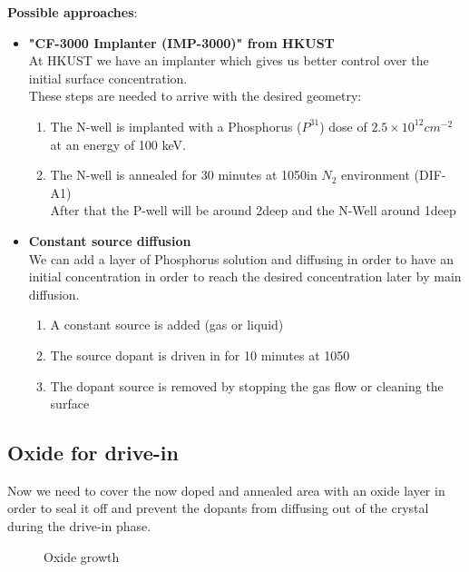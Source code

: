 \textbf{Possible approaches}:
\begin{itemize}
	\item \textbf{"CF-3000 Implanter (IMP-3000)" from HKUST} \\
	At HKUST we have an implanter which gives us better control over the initial surface concentration. \\
	These steps are needed to arrive with the desired geometry:
	\begin{enumerate}
		\item The N-well is implanted with a Phosphorus ($P^{31}$) dose of $2.5\times10^{12}cm^{-2}$ at an energy of 100 keV.
		\item The N-well is annealed for 30 minutes at 1050\degreesC in $N_2$ environment (DIF-A1)\\
		After that the P-well will be around 2\um deep and the N-Well around 1\um deep
	\end{enumerate}
	\item \textbf{Constant source diffusion} \\
	We can add a layer of Phosphorus solution and diffusing in order to have an initial concentration in order to reach the desired concentration later by main diffusion.
		\begin{enumerate}
		\item A constant source is added (gas or liquid)
		\item The source dopant is driven in for 10 minutes at 1050\degreesC
		\item The dopant source is removed by stopping the gas flow or cleaning the surface
	\end{enumerate}
\end{itemize}

\newpage

\subsection{Oxide for drive-in}

Now we need to cover the now doped and annealed area with an oxide layer in order to seal it off and prevent the dopants from diffusing out of the crystal during the drive-in phase.

\begin{figure}[H]
	\centering
	\begin{tikzpicture}[node distance = 3cm, auto, thick,scale=\CrossSectionOnly, every node/.style={transform shape}]
		
	\end{tikzpicture}
	\drawStepArrow{}
	\begin{tikzpicture}[node distance = 3cm, auto, thick,scale=\CrossSectionOnly, every node/.style={transform shape}]
		
	\end{tikzpicture}
	\caption{Oxide growth}
\end{figure}

